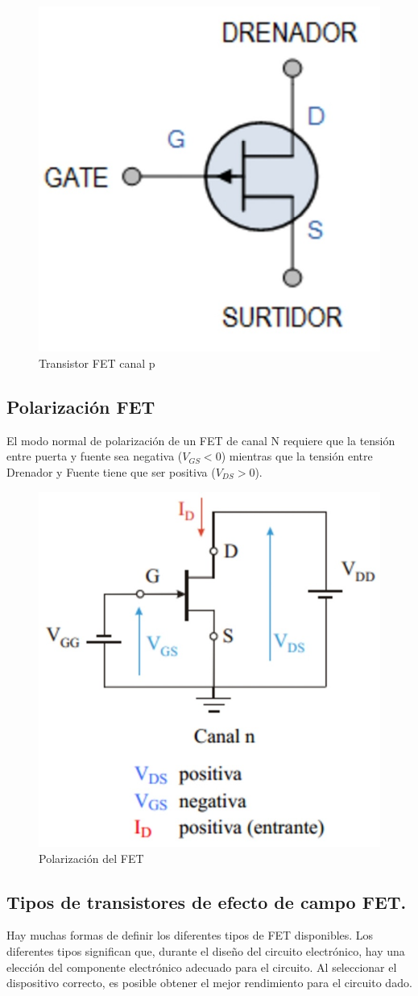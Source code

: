 \documentclass[12pt, a4paper]{article}
\begin{document}
    \begin{figure}[h!]
        \centering
        \includegraphics[height=5cm\textwidth]{fetp.jpg}
        \caption{Transistor FET canal p}
        \label{fig:t2}
    \end{figure}

    \subsection{Polarización FET}

    El modo normal de polarización de un FET de canal N requiere que la tensión entre puerta y fuente sea negativa ($V_{GS} < 0$) mientras que la tensión entre Drenador y Fuente tiene que ser positiva ($V_{DS} > 0$).

    \begin{figure}[h!]
        \centering
        \includegraphics[height=5cm\textwidth]{polarizacionfet.jpg}
        \caption{Polarización del FET}
        \label{fig:t3}
    \end{figure}

    \subsection{Tipos de transistores de efecto de campo FET.}

    Hay muchas formas de definir los diferentes tipos de FET disponibles. Los diferentes tipos significan que, durante el diseño del circuito electrónico, hay una elección del componente electrónico adecuado para el circuito. Al seleccionar el dispositivo correcto, es posible obtener el mejor rendimiento para el circuito dado.
    
\end{document}

